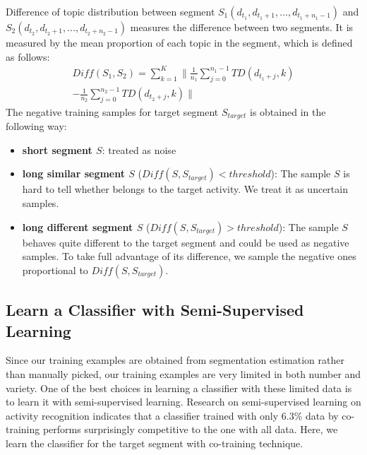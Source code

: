 \documentclass{sigchi}
\begin{document}
    Difference of topic distribution between segment $S_1(d_{t_1}, d_{t_1+1}, \ldots, d_{t_1 + n_1 - 1})$ and $S_2(d_{t_2}, d_{t_2+1}, \ldots, d_{t_2 + n_2 - 1})$ measures the difference between two segments.
    It is measured by the mean proportion of each topic in the segment, which is defined as follows:
        \begin{equation}
            \begin{split}
              Diff(S_1, S_2) =  \sum_{k=1}^K \| \frac{1}{n_1}\sum_{j=0}^{n_1-1} TD(d_{t_1+j}, k) \\
               - \frac{1}{n_2}\sum_{j=0}^{n_2-1} TD(d_{t_2+j}, k)\|
            \end{split}
        \end{equation}
    The negative training samples for target segment $S_{target}$ is obtained in the following way:
        \begin{itemize}
        \item \textbf{short segment $S$}: treated as noise

        \item \textbf{long similar segment $S$} ($Diff(S, S_{target}) < threshold$):
        The sample $S$ is hard to tell whether belongs to the target activity. We treat it as uncertain samples.

        \item \textbf{long different segment $S$} ($Diff(S, S_{target}) > threshold$):
        The sample $S$ behaves quite different to the target segment and could be used as negative samples. To take full advantage of its difference, we sample the negative ones proportional to $Diff(S, S_{target})$.
        \end{itemize}
    \subsection{Learn a Classifier with Semi-Supervised Learning}

    Since our training examples are obtained from segmentation estimation rather than manually picked, our training examples are very limited in both number and variety.
    One of the best choices in learning a classifier with these limited data is to learn it with semi-supervised learning.
    Research on semi-supervised learning on activity recognition \cite{stikic2008exploring} indicates that a classifier trained with only 6.3\% data by co-training performs surprisingly competitive to the one with all data.
    Here, we learn the classifier for the target segment with co-training technique.
\end{document}
